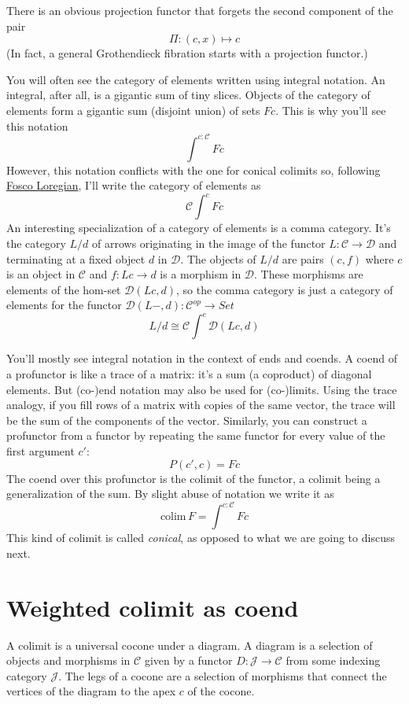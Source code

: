 \documentclass[11pt]{amsart}
\begin{document}
There is an obvious projection functor that forgets the second component of the pair
\[\Pi \colon (c, x) \mapsto c\]
(In fact, a general Grothendieck fibration starts with a projection functor.)

You will often see the category of elements written using integral notation. An integral, after all, is a gigantic sum of tiny slices. Objects of the category of elements form a gigantic sum (disjoint union) of sets $F c$. This is why you'll see this notation
\[\int^{c \colon \mathcal{C}} F c\]
However, this notation conflicts with the one for conical colimits so, following \href{https://arxiv.org/abs/1501.02503}{Fosco Loregian}, I'll write the category of elements as
\[\mathcal{C}\int^{c} F c\]
An interesting specialization of a category of elements is a comma category. It's the category $L/d$ of arrows originating in the image of the functor $L \colon \mathcal{C} \to \mathcal{D}$ and terminating at a fixed object $d$ in $\mathcal{D}$. The objects of $L/d$ are pairs $(c, f)$ where $c$ is an object in $\mathcal{C}$ and $f \colon L c \to d$ is a morphism in $\mathcal{D}$. These morphisms are elements of the hom-set $\mathcal{D}(L c , d)$, so the comma category is just a category of elements for the functor $\mathcal{D}(L-, d) \colon \mathcal{C}^{op} \to Set$
\[L/d \cong \mathcal{C}\int^{c} \mathcal{D}(L c, d)\]

You'll mostly see integral notation in the context of ends and coends. A coend of a profunctor is like a trace of a matrix: it's a sum (a coproduct) of diagonal elements. But (co-)end notation may also be used for (co-)limits. Using the trace analogy, if you fill rows of a matrix with copies of the same vector, the trace will be the sum of the components of the vector. Similarly, you can construct a profunctor from a functor by repeating the same functor for every value of the first argument $c'$:
\[ P(c', c) = F c\]
The coend over this profunctor is the colimit of the functor, a colimit being a generalization of the sum. By slight abuse of notation we write it as
\[ \mbox{colim}\, F = \int^{c \colon \mathcal{C}} F c \]
This kind of colimit is called \emph{conical}, as opposed to what we are going to discuss next.
\section{Weighted colimit as coend}
A colimit is a universal cocone under a diagram. A diagram is a selection of objects and morphisms in $\mathcal{C}$ given by a functor $D \colon \mathcal{J} \to \mathcal{C}$ from some indexing category $\mathcal{J}$. The legs of a cocone are a selection of morphisms that connect the vertices of the diagram to the apex $c$ of the cocone. 
\end{document}
